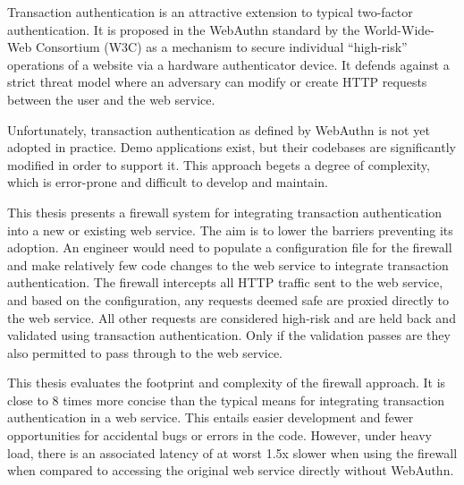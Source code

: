 % 
% 
%



Transaction authentication is an attractive extension to typical two-factor authentication. It is proposed in the WebAuthn standard by the World-Wide-Web Consortium (W3C) as a mechanism to secure individual ``high-risk'' operations of a website via a hardware authenticator device. It defends against a strict threat model where an adversary can modify or create HTTP requests between the user and the web service.

Unfortunately, transaction authentication as defined by WebAuthn is not yet adopted in practice. Demo applications exist, but their codebases are significantly modified in order to support it. This approach begets a degree of complexity, which is error-prone and difficult to develop and maintain.



This thesis presents a firewall system for integrating transaction authentication into a new or existing web service. The aim is to lower the barriers preventing its adoption. An engineer would need to populate a configuration file for the firewall and make relatively few code changes to the web service to integrate transaction authentication. The firewall intercepts all HTTP traffic sent to the web service, and based on the configuration, any requests deemed safe are proxied directly to the web service. All other requests are considered high-risk and are held back and validated using transaction authentication. Only if the validation passes are they also permitted to pass through to the web service.

This thesis evaluates the footprint and complexity of the firewall approach. It is close to 8 times more concise than the typical means for integrating transaction authentication in a web service. This entails easier development and fewer opportunities for accidental bugs or errors in the code. However, under heavy load, there is an associated latency of at worst 1.5x slower when using the firewall when compared to accessing the original web service directly without WebAuthn.
